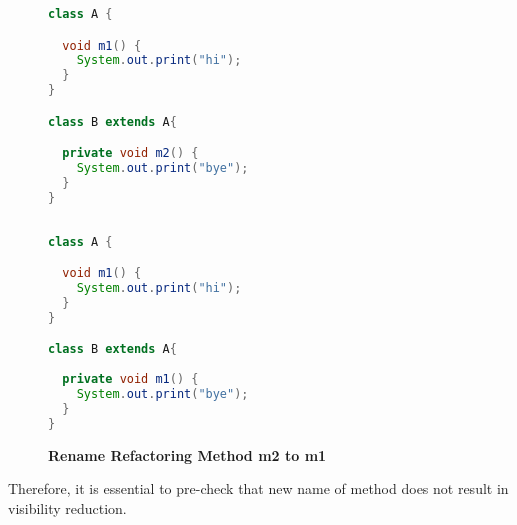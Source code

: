 \begin{figure}[th]
\centering
\begin{minipage}[t]{0.47\linewidth}
\begin{lstlisting}[language=java, basicstyle=\scriptsize\ttfamily,frame=single]
class A {

  void m1() {
    System.out.print("hi");
  }
}

class B extends A{

  private void m2() {
    System.out.print("bye");
  }	
}
 
\end{lstlisting}
\end{minipage}
\hfill
\begin{minipage}[t]{0.47\linewidth}
\begin{lstlisting}[language=java, basicstyle=\scriptsize\ttfamily,frame=single]
class A {

  void m1() {
    System.out.print("hi");
  }
}

class B extends A{
 
  private void m1() {
    System.out.print("bye");
  }	
}

\end{lstlisting}
\end{minipage}
\caption{\textbf{Rename Refactoring Method m2 to m1}}
\label{fig:RmR3}
\end{figure}

Therefore, it is essential to pre-check that new name of method does not result in visibility reduction. 